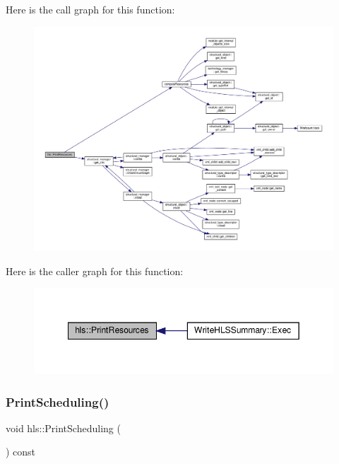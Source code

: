 Here is the call graph for this function\+:
\nopagebreak
\begin{figure}[H]
\begin{center}
\leavevmode
\includegraphics[width=350pt]{d5/d18/classhls_ac9ec57688c391652f3788021ce09ced2_cgraph}
\end{center}
\end{figure}
Here is the caller graph for this function\+:
\nopagebreak
\begin{figure}[H]
\begin{center}
\leavevmode
\includegraphics[width=349pt]{d5/d18/classhls_ac9ec57688c391652f3788021ce09ced2_icgraph}
\end{center}
\end{figure}
\mbox{\label{classhls_a2e962663a506e65c616c38044f1fcd66}} 
\subsubsection{\texorpdfstring{Print\+Scheduling()}{PrintScheduling()}}
{\footnotesize\ttfamily void hls\+::\+Print\+Scheduling (\begin{DoxyParamCaption}{ }\end{DoxyParamCaption}) const}



